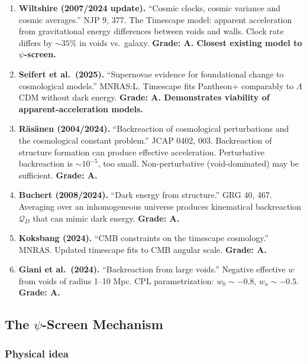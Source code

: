 \documentclass[11pt,a4paper]{article}
\begin{document}
\begin{enumerate}
\item \textbf{Wiltshire (2007/2024 update).} ``Cosmic clocks, cosmic variance and cosmic averages.'' NJP 9, 377. The Timescape model: apparent acceleration from gravitational energy differences between voids and walls. Clock rate differs by $\sim 35\%$ in voids vs.\ galaxy. \textbf{Grade: A. Closest existing model to $\psi$-screen.}

\item \textbf{Seifert et al.\ (2025).} ``Supernovae evidence for foundational change to cosmological models.'' MNRAS:L. Timescape fits Pantheon+ comparably to $\Lambda$CDM without dark energy. \textbf{Grade: A. Demonstrates viability of apparent-acceleration models.}

\item \textbf{R\"as\"anen (2004/2024).} ``Backreaction of cosmological perturbations and the cosmological constant problem.'' JCAP 0402, 003. Backreaction of structure formation can produce effective acceleration. Perturbative backreaction is $\sim 10^{-5}$, too small. Non-perturbative (void-dominated) may be sufficient. \textbf{Grade: A.}

\item \textbf{Buchert (2008/2024).} ``Dark energy from structure.'' GRG 40, 467. Averaging over an inhomogeneous universe produces kinematical backreaction $\mathcal{Q}_D$ that can mimic dark energy. \textbf{Grade: A.}

\item \textbf{Koksbang (2024).} ``CMB constraints on the timescape cosmology.'' MNRAS. Updated timescape fits to CMB angular scale. \textbf{Grade: A.}

\item \textbf{Giani et al.\ (2024).} ``Backreaction from large voids.'' Negative effective $w$ from voids of radius 1--10 Mpc. CPL parametrization: $w_0 \sim -0.8$, $w_a \sim -0.5$. \textbf{Grade: A.}
\end{enumerate}

\subsection{The $\psi$-Screen Mechanism}

\subsubsection{Physical idea}
\end{document}

